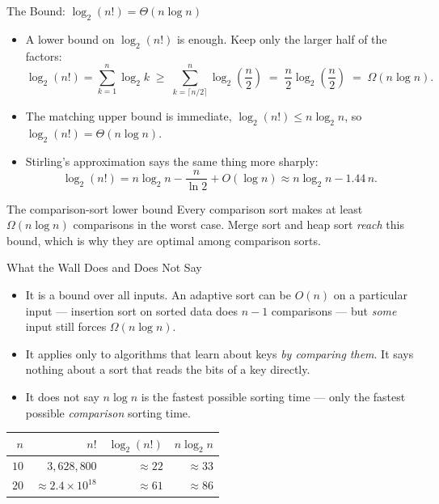 \documentclass[aspectratio=169]{beamer}
\begin{document}
\begin{frame}{The Bound: $\log_2(n!) = \Theta(n\log n)$}
  \begin{itemize}
    \item A lower bound on $\log_2(n!)$ is enough. Keep only the larger half
      of the factors:
      \[ \log_2(n!) = \sum_{k=1}^{n}\log_2 k
         \;\ge\; \sum_{k=\lceil n/2\rceil}^{n}\log_2\!\left(\frac{n}{2}\right)
         \;=\; \frac{n}{2}\log_2\!\left(\frac{n}{2}\right)
         \;=\; \Omega(n\log n). \]
    \item The matching upper bound is immediate, $\log_2(n!) \le n\log_2 n$,
      so $\log_2(n!) = \Theta(n\log n)$.
    \item Stirling's approximation says the same thing more sharply:
      \[ \log_2(n!) = n\log_2 n - \frac{n}{\ln 2} + O(\log n)
         \approx n\log_2 n - 1.44\,n. \]
  \end{itemize}
  \begin{alertblock}{The comparison-sort lower bound}
    Every comparison sort makes at least $\Omega(n\log n)$ comparisons in the
    worst case. Merge sort and heap sort \emph{reach} this bound, which is
    why they are optimal among comparison sorts.
  \end{alertblock}
\end{frame}

\begin{frame}{What the Wall Does and Does Not Say}
  \begin{itemize}
    \item It is a  bound over all inputs. An adaptive sort
      can be $O(n)$ on a particular input --- insertion sort on sorted data
      does $n-1$ comparisons --- but \emph{some} input still forces
      $\Omega(n\log n)$.
    \item It applies only to algorithms that learn about keys \emph{by
      comparing them}. It says nothing about a sort that reads the bits of a
      key directly.
    \item It does not say $n\log n$ is the fastest possible sorting time ---
      only the fastest possible \emph{comparison} sorting time.
  \end{itemize}
  \begin{center}
  {\footnotesize
  \begin{tabular}{rrrr}
    \toprule
    $n$ & $n!$ & $\log_2(n!)$ & $n\log_2 n$ \\
    \midrule
    $10$ & $3{,}628{,}800$ & $\approx 22$ & $\approx 33$ \\
    $20$ & $\approx 2.4\times10^{18}$ & $\approx 61$ & $\approx 86$ \\
    \bottomrule
  \end{tabular}}
  \end{center}
\end{frame}
\end{document}
